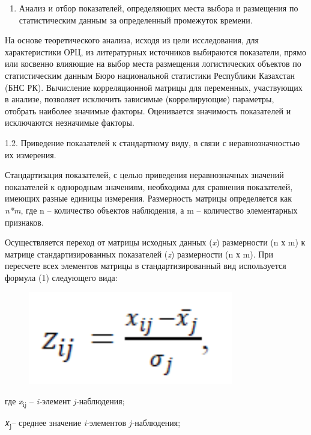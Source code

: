 \begin{enumerate}
\def\labelenumi{\arabic{enumi}.}
\item
  Анализ и отбор показателей, определяющих места выбора и размещения по
  статистическим данным за определенный промежуток времени.
\end{enumerate}

На основе теоретического анализа, исходя из цели исследования, для
характеристики ОРЦ, из литературных источников выбираются показатели,
прямо или косвенно влияющие на выбор места размещения логистических
объектов по статистическим данным Бюро национальной статистики
Республики Казахстан (БНС РК). Вычисление корреляционной матрицы для
переменных, участвующих в анализе, позволяет исключить зависимые
(коррелирующие) параметры, отобрать наиболее значимые факторы.
Оценивается значимость показателей и исключаются незначимые факторы.

1.2. Приведение показателей к стандартному виду, в связи с
неравнозначностью их измерения.

Стандартизация показателей, с целью приведения неравнозначных значений
показателей к однородным значениям, необходима для сравнения
показателей, имеющих разные единицы измерения. Размерность матрицы
определяется как \emph{n*m}, где n -- количество объектов наблюдения, а
m -- количество элементарных признаков.

Осуществляется переход от матрицы исходных данных (\emph{x}) размерности
(n х m) к матрице стандартизированных показателей (\emph{z}) размерности
(n х m). При пересчете всех элементов матрицы в стандартизированный вид
используется формула (1) следующего вида:

\begin{figure}[H]
	\centering
	\includegraphics[width=0.8\textwidth]{media/ekon2/image9}
	\caption*{}
\end{figure}


где \emph{x}\textsubscript{ij} -- \emph{i-}элемент \emph{j-}наблюдения;

𝑥\textsubscript{j}-- среднее значение \emph{i-}элементов
\emph{j-}наблюдения;

